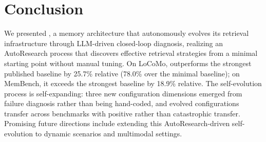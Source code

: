 \section{Conclusion}
\label{sec:conclusion}

We presented \ours{}, a memory architecture that autonomously evolves its retrieval infrastructure through LLM-driven closed-loop diagnosis, realizing an AutoResearch process that discovers effective retrieval strategies from a minimal starting point without manual tuning. On LoCoMo, \ours{} outperforms the strongest published baseline by 25.7\% relative (78.0\% over the minimal baseline); on MemBench, it exceeds the strongest baseline by 18.9\% relative. The self-evolution process is self-expanding: three new configuration dimensions emerged from failure diagnosis rather than being hand-coded, and evolved configurations transfer across benchmarks with positive rather than catastrophic transfer. Promising future directions include extending this AutoResearch-driven self-evolution to dynamic scenarios and multimodal settings.